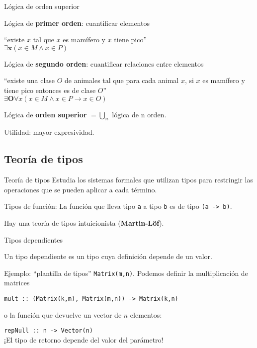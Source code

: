 \begin{frame}{Lógica de orden superior}

Lógica de \textbf{primer orden}: cuantificar elementos
\begin{center}
``existe $x$ tal que $x$ es mamífero y $x$ tiene pico''\\
$\bm{\exists x}(x\in M \wedge x\in P)$
\end{center}

Lógica de \textbf{segundo orden}: cuantificar relaciones entre elementos
\begin{center}
``existe una clase $O$ de animales tal que para cada animal $x$, si $x$ es mamífero y tiene pico entonces es de clase $O$''\\
$\bm{\exists O} \forall x (x\in M\wedge x\in P\rightarrow x\in O)$
\end{center}

Lógica de \textbf{orden superior} $=\bigcup\limits_n$ lógica de n orden.

Utilidad: mayor expresividad.

\end{frame}

\subsection{Teoría de tipos}

\begin{frame}{Teoría de tipos}
Estudia los sistemas formales que utilizan tipos para restringir las operaciones que se pueden aplicar a cada término.

Tipos de función: La función que lleva tipo \texttt{a} a tipo \texttt{b} es de tipo \texttt{(a -> b)}.

Hay una teoría de tipos intuicionista (\textbf{Martin-Löf}).

\end{frame}

\begin{frame}{Tipos dependientes}

Un tipo dependiente es un tipo cuya definición depende de un valor.

Ejemplo: ``plantilla de tipos'' \texttt{Matrix(m,n)}. Podemos definir la multiplicación de matrices
\begin{center}
\texttt{mult :: (Matrix(k,m), Matrix(m,n)) -> Matrix(k,n)}
\end{center}
o la función que devuelve un vector de $n$ elementos:
\begin{center}
\texttt{repNull :: n -> Vector(n)}\\
¡El tipo de retorno depende del valor del parámetro!
\end{center}

\end{frame}

